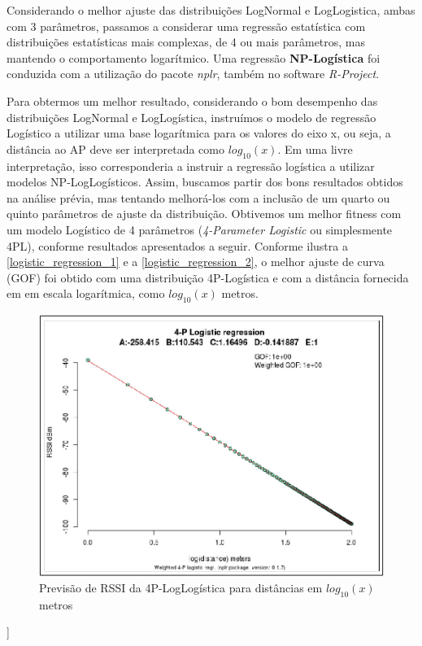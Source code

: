 \documentclass[
	12pt,				%
	openright,			%
	twoside,			%
	a4paper,			%
	english,			%
	french,				%
	spanish,			%
	brazil				%
	]{abntex2}
\begin{document}
Considerando o melhor ajuste das distribuições LogNormal e LogLogistica, ambas com  3 parâmetros, passamos a considerar uma regressão estatística com distribuições estatísticas mais complexas, de 4 ou mais parâmetros, mas mantendo o comportamento logarítmico. Uma regressão \textbf{NP-Logística} foi conduzida com a utilização do pacote \textit{nplr}, também no software \textit{R-Project}.

Para obtermos um melhor resultado, considerando o bom desempenho das distribuições LogNormal e LogLogística, instruímos o modelo de regressão Logístico a utilizar uma base logarítmica para os valores do eixo x, ou seja, a distância ao AP deve ser interpretada como $ log_{10}(x) $. Em uma livre interpretação, isso corresponderia a instruir a regressão logística a utilizar modelos NP-LogLogísticos. Assim, buscamos partir dos bons resultados obtidos na análise prévia, mas tentando melhorá-los com a inclusão de um quarto ou quinto parâmetros de ajuste da distribuição.  Obtivemos um melhor fitness com um modelo Logístico de 4 parâmetros (\textit{4-Parameter Logistic} ou simplesmente 4PL), conforme resultados apresentados a seguir. Conforme ilustra a \autoref{logistic_regression_1} e a \autoref{logistic_regression_2}, o melhor ajuste de curva (GOF) foi obtido com uma distribuição 4P-Logística e com a distância fornecida em em escala logarítmica, como $ log_{10}(x) $ metros.

\begin{figure}[htb]
	\caption{\label{logistic_regression_1} Previsão de RSSI da 4P-LogLogística para distâncias em $ log_{10}(x) $ metros}
	\begin{center}
		\includegraphics[scale=0.47]{images/logistic-regression-1.jpg}
	\end{center}
\end{figure}]
\end{document}
